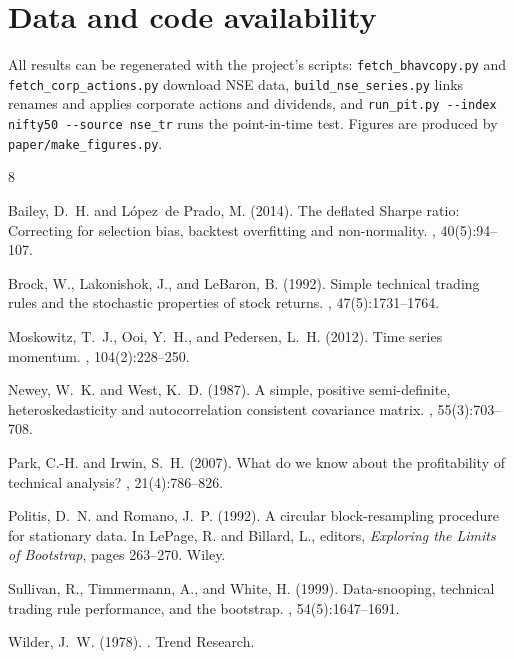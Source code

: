 \documentclass[11pt]{article}
\begin{document}
\section*{Data and code availability}
All results can be regenerated with the project's scripts: \texttt{fetch\_bhavcopy.py} and
\texttt{fetch\_corp\_actions.py} download NSE data, \texttt{build\_nse\_series.py} links renames and applies
corporate actions and dividends, and \texttt{run\_pit.py -{}-index nifty50 -{}-source nse\_tr} runs the point-in-time
test. Figures are produced by \texttt{paper/make\_figures.py}.

\begin{thebibliography}{8}

Bailey, D.~H. and L{\'o}pez~de Prado, M. (2014).
\newblock The deflated {S}harpe ratio: Correcting for selection bias, backtest overfitting and non-normality.
, 40(5):94--107.

Brock, W., Lakonishok, J., and LeBaron, B. (1992).
\newblock Simple technical trading rules and the stochastic properties of stock returns.
, 47(5):1731--1764.

Moskowitz, T.~J., Ooi, Y.~H., and Pedersen, L.~H. (2012).
\newblock Time series momentum.
, 104(2):228--250.

Newey, W.~K. and West, K.~D. (1987).
\newblock A simple, positive semi-definite, heteroskedasticity and autocorrelation consistent covariance matrix.
, 55(3):703--708.

Park, C.-H. and Irwin, S.~H. (2007).
\newblock What do we know about the profitability of technical analysis?
, 21(4):786--826.

Politis, D.~N. and Romano, J.~P. (1992).
\newblock A circular block-resampling procedure for stationary data.
\newblock In LePage, R. and Billard, L., editors, {\em Exploring the Limits of Bootstrap}, pages 263--270. Wiley.

Sullivan, R., Timmermann, A., and White, H. (1999).
\newblock Data-snooping, technical trading rule performance, and the bootstrap.
, 54(5):1647--1691.

Wilder, J.~W. (1978).
.
\newblock Trend Research.

\end{thebibliography}
\end{document}

